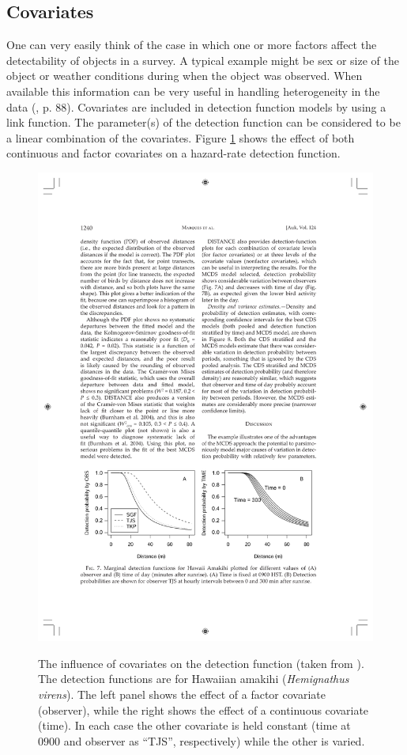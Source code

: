 \subsection{Covariates}
One can very easily think of the case in which one or more factors affect the detectability of objects in a survey. A typical example might be sex or size of the object or weather conditions during when the object was observed. When available this information can be very useful in handling heterogeneity in the data (\cite{IDS}, p. 88). Covariates are included in detection function models by using a link function. The parameter(s) of the detection function can be considered to be a linear combination of the covariates. Figure \ref{ds-covarex} shows the effect of both continuous and factor covariates on a hazard-rate detection function.

\begin{figure}
\centering
\includegraphics{intro/figs/amakihi-detfct.pdf}\\
\caption{The influence of covariates on the detection function (taken from \cite{amakihi}). The detection functions are for Hawaiian amakihi (\textit{Hemignathus virens}). The left panel shows the effect of a factor covariate (observer), while the right shows the effect of a continuous covariate (time). In each case the other covariate is held constant (time at $0900$ and observer as ``TJS'', respectively) while the other is varied.}
\label{ds-covarex}
\end{figure}


